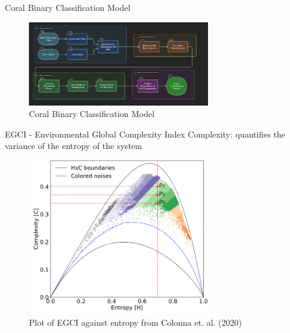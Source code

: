 \begin{frame}{Coral Binary Classification Model}
    \begin{figure}
        \centering
        \includegraphics[height=0.7\textheight,width=0.7\textwidth,keepaspectratio]{images/aid_1.png}
        \caption{Coral Binary Classification Model}
    \end{figure}
\end{frame}

\begin{frame}{EGCI - Environmental Global Complexity Index}
    Complexity: quantifies the variance of the entropy of the system
    \begin{figure}
        \centering
        \includegraphics[height=0.7\textheight,width=0.7\textwidth,keepaspectratio]{images/aid_3.png}
        \caption{Plot of EGCI against entropy from Colonna et. al. (2020)}
    \end{figure}
\end{frame}


